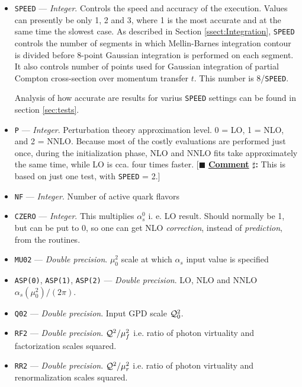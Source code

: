 \documentclass[12pt]{article}
\newcounter{comment}
\newcommand{\comminline}[1]{{%
\refstepcounter{comment}%
\ttfamily\small[$\blacksquare$ \textbf{\underline{Comment}
$\sharp$\thecomment:} #1]}}
\begin{document}
\begin{itemize}
\item
\texttt{SPEED} --- \emph{Integer}. Controls the speed and accuracy of the execution. Values can
presently be only 1, 2 and 3, where 1 is the most accurate and at the
same time the slowest case.
As described in Section \ref{ssect:Integration}, \texttt{SPEED} controls the number
of segments in which Mellin-Barnes integration contour is divided before 8-point
Gaussian integration is performed on each segment. It also controls number of
points used for Gaussian integration of partial Compton cross-section over
momentum transfer $t$. This number is 8/\texttt{SPEED}. 

Analysis of how accurate are results for varius \texttt{SPEED} settings can
be found in section \ref{sec:tests}.

\item
\texttt{P} --- \emph{Integer}. Perturbation theory approximation level. 0 = LO, 1 = NLO, and
  2 = NNLO. Because most of the costly evaluations are performed just once,
  during the initialization phase, NLO and NNLO fits take approximately the
  same time, while LO is cca. four times faster. \comminline{This is based
  on just one test, with \texttt{SPEED} = 2.}

\item
\texttt{NF} --- \emph{Integer}. Number of active quark flavors

\item
\texttt{CZERO} --- \emph{Integer}. This multiplies $\alpha_{s}^{0}$ i. e. LO result.
  Should normally be 1, but can be put to 0, so one can get NLO \emph{correction},
  instead of \emph{prediction}, from the routines.

\item
\texttt{MU02} --- \emph{Double precision}. $\mu_{0}^2$ scale at which
$\alpha_s$ input value is specified

\item
\texttt{ASP(0)}, \texttt{ASP(1)}, \texttt{ASP(2)} --- 
\emph{Double precision}. LO, NLO and NNLO $\alpha_{s}(\mu_{0}^2)/(2\pi)$.

\item
\texttt{Q02} --- \emph{Double precision}. Input GPD scale ${\cal Q}_{0}^2$.

\item
\texttt{RF2} --- \emph{Double precision}. $ {\cal Q}^2/{\mu_{f}^2}$ i.e. ratio
of photon virtuality and factorization scales squared.

\item
\texttt{RR2} --- \emph{Double precision}. $ {\cal Q}^2/{\mu_{r}^2}$ i.e. ratio
of photon virtuality and renormalization scales squared.


\end{itemize}
\end{document}
